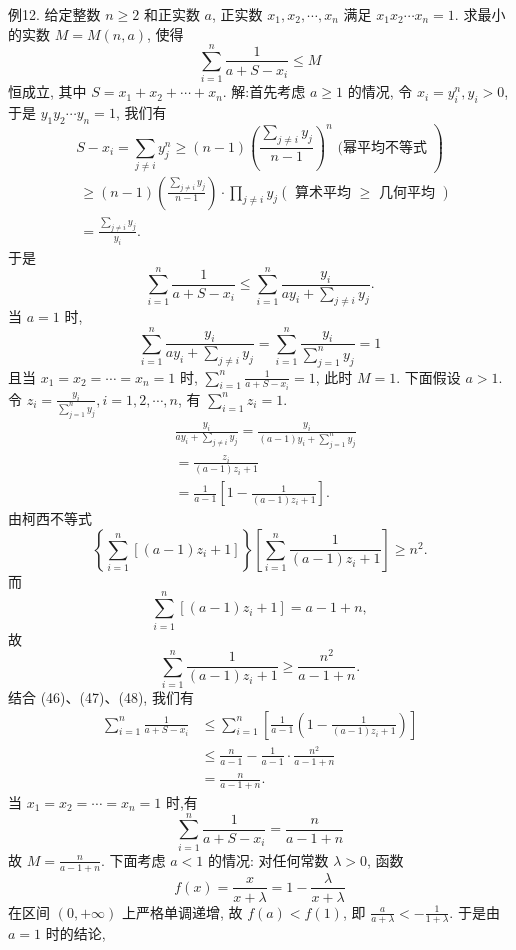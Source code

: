 例12. 给定整数 $n \geqslant 2$ 和正实数 $a$, 正实数 $x_1, x_2, \cdots, x_n$ 满足 $x_1 x_2 \cdots x_n=1$. 求最小的实数 $M=M(n, a)$, 使得
$$
\sum_{i=1}^n \frac{1}{a+S-x_i} \leqslant M
$$
恒成立, 其中 $S=x_1+x_2+\cdots+x_n$.
解:首先考虑 $a \geqslant 1$ 的情况, 令 $x_i=y_i^n, y_i>0$, 于是 $y_1 y_2 \cdots y_n=1$, 我们有
$$
\left.S-x_i=\sum_{j \neq i} y_j^n \geqslant(n-1)\left(\frac{\sum_{j \neq i} y_j}{n-1}\right)^n \text { (幂平均不等式 }\right)
$$
$$
\begin{aligned}
& \geqslant(n-1)\left(\frac{\sum_{j \neq i} y_j}{n-1}\right) \cdot \prod_{j \neq i} y_j(\text { 算术平均 } \geqslant \text { 几何平均 }) \\
& =\frac{\sum_{j \neq i} y_j}{y_i} .
\end{aligned}
$$
于是
$$
\sum_{i=1}^n \frac{1}{a+S-x_i} \leqslant \sum_{i=1}^n \frac{y_i}{a y_i+\sum_{j \neq i} y_j} . \label{(46)}
$$
当 $a=1$ 时,
$$
\sum_{i=1}^n \frac{y_i}{a y_i+\sum_{j \neq i} y_j}=\sum_{i=1}^n \frac{y_i}{\sum_{j=1}^n y_j}=1
$$
且当 $x_1=x_2=\cdots=x_n=1$ 时, $\sum_{i=1}^n \frac{1}{a+S-x_i}=1$, 此时 $M=1$.
下面假设 $a>1$. 令 $z_i=\frac{y_i}{\sum_{j=1}^n y_j}, i=1,2, \cdots, n$, 有 $\sum_{i=1}^n z_i=1$.
$$
\begin{aligned}
& \frac{y_i}{a y_i+\sum_{j \neq i} y_j}=\frac{y_i}{(a-1) y_i+\sum_{j=1}^n y_j} \\
& =\frac{z_i}{(a-1) z_i+1} \\
& =\frac{1}{a-1}\left[1-\frac{1}{(a-1) z_i+1}\right] .
\end{aligned} \label{(47)}
$$
由柯西不等式
$$
\left\{\sum_{i=1}^n\left[(a-1) z_i+1\right]\right\}\left[\sum_{i=1}^n \frac{1}{(a-1) z_i+1}\right] \geqslant n^2 .
$$
而
$$
\sum_{i=1}^n\left[(a-1) z_i+1\right]=a-1+n,
$$
故
$$
\sum_{i=1}^n \frac{1}{(a-1) z_i+1} \geqslant \frac{n^2}{a-1+n} . \label{(48)}
$$
结合 (46)、(47)、(48), 我们有
$$
\begin{aligned}
\sum_{i=1}^n \frac{1}{a+S-x_i} & \leqslant \sum_{i=1}^n\left[\frac{1}{a-1}\left(1-\frac{1}{(a-1) z_i+1}\right)\right] \\
& \leqslant \frac{n}{a-1}-\frac{1}{a-1} \cdot \frac{n^2}{a-1+n} \\
& =\frac{n}{a-1+n} .
\end{aligned}
$$
当 $x_1=x_2=\cdots=x_n=1$ 时,有
$$
\sum_{i=1}^n \frac{1}{a+S-x_i}=\frac{n}{a-1+n}
$$
故 $M=\frac{n}{a-1+n}$.
下面考虑 $a<1$ 的情况: 对任何常数 $\lambda>0$, 函数
$$
f(x)=\frac{x}{x+\lambda}=1-\frac{\lambda}{x+\lambda}
$$
在区间 $(0,+\infty)$ 上严格单调递增, 故 $f(a)<f(1)$, 即 $\frac{a}{a+\lambda}<-\frac{1}{1+\lambda}$. 于是由 $a=1$ 时的结论,
